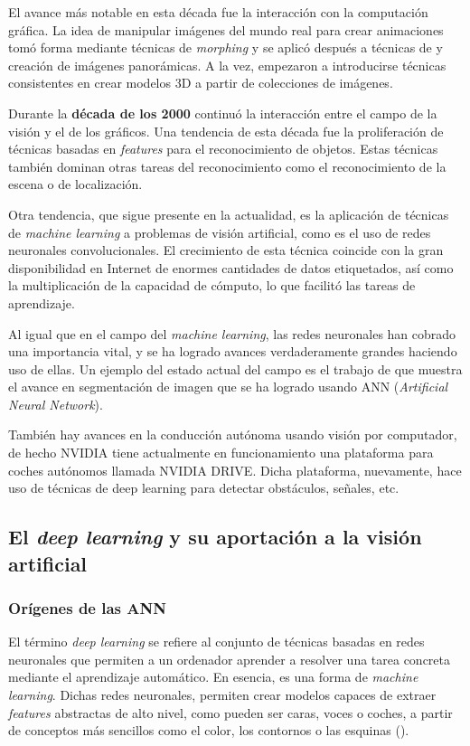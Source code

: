 El avance más notable en esta década fue la interacción con la computación gráfica. La idea de manipular imágenes del mundo real para crear animaciones tomó forma mediante técnicas de \textit{morphing} y se aplicó después a técnicas de 
 y creación de imágenes panorámicas. A la vez, empezaron a introducirse técnicas consistentes en crear modelos 3D a partir de colecciones de imágenes.

Durante la \textbf{década de los 2000} continuó la interacción entre el campo de la visión y el de los gráficos. Una tendencia de esta década fue la proliferación de técnicas basadas en \textit{features} para el reconocimiento de objetos. Estas técnicas también dominan otras tareas del reconocimiento como el reconocimiento de la escena o de localización.

Otra tendencia, que sigue presente en la actualidad, es la aplicación de técnicas de \textit{machine learning} a problemas de visión artificial, como es el uso de redes neuronales convolucionales. El crecimiento de esta técnica coincide con la gran disponibilidad en Internet de enormes cantidades de datos etiquetados, así como la multiplicación de la capacidad de cómputo, lo que facilitó las tareas de aprendizaje.

Al igual que en el campo del \textit{machine learning}, las redes neuronales han cobrado una importancia vital, y se ha logrado avances verdaderamente grandes haciendo uso de ellas. Un ejemplo del estado actual del campo es el trabajo de \citet{art:2017arXiv170306870H} que muestra el avance en segmentación de imagen que se ha logrado usando ANN (\textit{Artificial Neural Network}).

También hay avances en la conducción autónoma usando visión por computador, de hecho NVIDIA tiene actualmente en funcionamiento una plataforma para coches autónomos llamada NVIDIA DRIVE. Dicha plataforma, nuevamente, hace uso de técnicas de deep learning para detectar obstáculos, señales, etc.

\subsection{El \textit{deep learning} y su aportación a la visión artificial}
\subsubsection*{Orígenes de las ANN}

El término \textit{deep learning} se refiere al conjunto de técnicas basadas en redes neuronales que permiten a un ordenador aprender a resolver una tarea concreta mediante el aprendizaje automático. En esencia, es una forma de \textit{machine learning}. Dichas redes neuronales, permiten crear modelos capaces de extraer \textit{features} abstractas de alto nivel, como pueden ser caras, voces o coches, a partir de conceptos más sencillos como el color, los contornos o las esquinas (\citet{book:Goodfellow-et-al-2016}).

